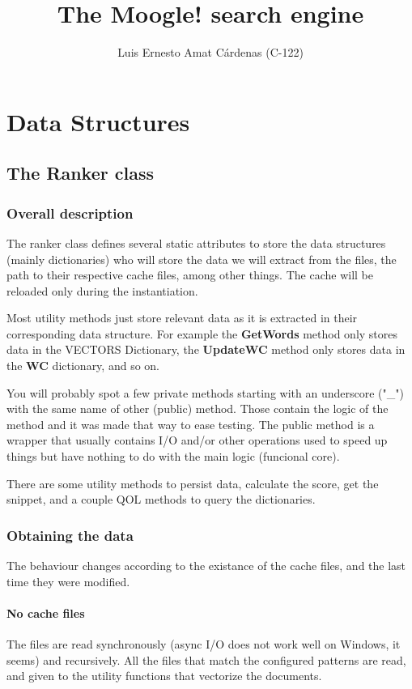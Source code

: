\documentclass{report}
\title{The Moogle! search engine}
\author{Luis Ernesto Amat Cárdenas (C-122)}
\begin{document}
\maketitle

\tableofcontents

\chapter{Data Structures}
\section{The Ranker class}


\subsection{Overall description}

The ranker class defines several static attributes to store the data structures (mainly dictionaries) who will store the data we will extract from the files, the path to their respective cache files, among other things.
The cache will be reloaded only during the instantiation.

Most utility methods just store relevant data as it is extracted in their corresponding data structure. For example the \textbf{GetWords} method only stores data in the VECTORS Dictionary, the \textbf{UpdateWC} method only stores data in the \textbf{WC} dictionary, and so on.

You will probably spot a few private methods starting with an underscore ("\_") with the same name of other (public) method. Those contain the logic of the method and it was made that way to ease testing. The public method is a wrapper that usually contains I/O and/or other operations used to speed up things but have nothing to do with the main logic (funcional core).

There are some utility methods to persist data, calculate the score, get the snippet, and a couple QOL methods to query the dictionaries.

\subsection{Obtaining the data}

The behaviour changes according to the existance of the cache files, and the last time they were modified.

\subsubsection{No cache files}
The files are read synchronously (async I/O does not work well on Windows, it seems) and recursively. All the files that match the configured patterns are read, and given to the utility functions that vectorize the documents.
\end{document}
